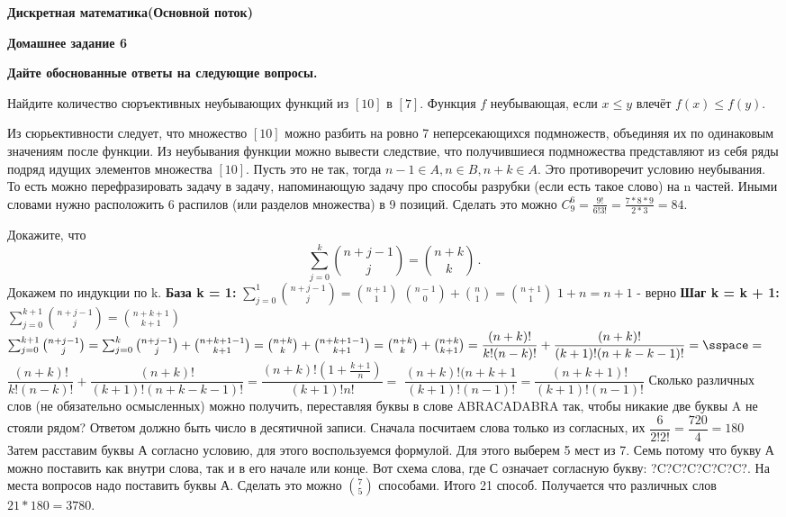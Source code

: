 \documentclass[11pt]{article}
\def\week{6}
\def\theproblem{К\week.\arabic{problem}}
\begin{document}
	\setcounter{problem}{0}
	\def\theproblem{Д\week.\arabic{problem}}
	{\textbf{\large Дискретная математика}\hfill \textbf{(Основной поток)}
		
		\medskip %
		
		\textbf{Домашнее задание \week}}
	
	\medskip
	
	\textbf{Дайте обоснованные ответы на следующие вопросы.}
	
	
	\vspace{5mm}
	
	\p Найдите количество сюръективных неубывающих функций из $[10]$ в $[7]$. Функция $f$ неубывающая, если $x\leq y$ влечёт $f(x) \leq f(y)$.
	
	Из сюрьективности следует, что множество $[10]$ можно разбить на ровно 7 неперсекающихся подмножеств, объединяя их по одинаковым значениям после функции. Из неубывания функции можно вывести следствие, что получившиеся подмножества представляют из себя ряды подряд идущих элементов множества $[10]$. Пусть это не так, тогда $n - 1 \in A, n \in B, n + k \in A$. Это противоречит условию неубывания. То есть можно перефразировать задачу в задачу, напоминающую задачу про способы разрубки (если есть такое слово) на n частей. Иными словами нужно расположить 6 распилов (или разделов множества) в 9 позиций. Сделать это можно $C_9^6 = \frac{9!}{6!3!} = \frac{7*8*9}{2 * 3} = 84$. \sspace
	
	\p Докажите, что
	\[
	\sum_{j=0}^k \binom{n+j-1}{j} = \binom{n+k}{k}\,.
	\]
	\bs
	Докажем по индукции по k. \sspace
	\textbf{База k = 1:} $\sum_{j=0}^1 \binom{n+j-1}{j} = \binom{n+1}{1}$ \sspace
	$\binom{n - 1}{0} + \binom{n}{1}  = \binom{n + 1}{1}$ \sspace
	$1 + n = n + 1$ - верно \sspace
	\textbf{Шаг k = k + 1:} $\sum_{j=0}^{k + 1} \binom{n+j-1}{j} = \binom{n+k+1}{k + 1}$ \sspace
	$\sum_{j=0}^{k + 1} \binom{n+j-1}{j} = \sum_{j=0}^k \binom{n+j-1}{j} + \binom{n + k + 1 - 1}{k + 1}= \binom{n+k}{k} + \binom{n + k + 1 - 1}{k + 1} = \binom{n + k}{k} + \binom{n + k}{k + 1} = \dfrac{(n + k)!}{k!(n - k)!} + \dfrac{(n + k)!}{(k + 1)!(n + k - k - 1)!} = \sspace = $ 
	$\dfrac{(n + k)!}{k!(n - k)!} + \dfrac{(n + k)!}{(k + 1)!(n + k - k - 1)!} = \dfrac{(n + k)!(1 + \frac{k + 1}{n})}{(k + 1)!n!} = $
	$\dfrac{(n + k)!(n + k + 1}{(k + 1)!(n - 1)!} = \dfrac{(n + k + 1)!}{(k + 1)!(n - 1)!}$
	\bs
	\p
	Сколько различных слов (не обязательно осмысленных) можно получить,
	переставляя буквы в слове ABRACADABRA так, чтобы никакие
	две буквы A не стояли рядом? Ответом должно быть число в десятичной записи.
	\bs
	Сначала посчитаем слова только из согласных, их $\dfrac{6}{2!2!} = \dfrac{720}{4} = 180$ \\
	Затем расставим буквы А согласно условию, для этого воспользуемся формулой. Для этого выберем 5 мест из 7. Семь потому что букву А можно поставить как внутри слова, так и в его начале или конце. Вот схема слова, где С означает согласную букву: ?C?C?C?C?C?C?. На места вопросов надо поставить буквы А. Сделать это можно $\binom{7}{5}$ способами. Итого 21 способ. Получается что различных слов $21*180 = 3780$. 
	\sspace
	
\end{document}
